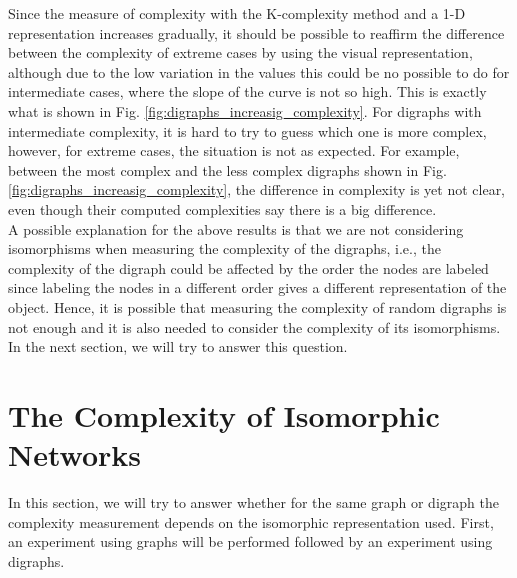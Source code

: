 Since the measure of complexity with the K-complexity method and a 1-D representation increases gradually, it should be possible to reaffirm the difference between the complexity of extreme cases by using the visual representation, although due to the low variation in the values this could be no possible to do for intermediate cases, where the slope of the curve is not so high.  This is exactly what is shown in Fig. \ref{fig:digraphs_increasig_complexity}. For digraphs with intermediate complexity, it is hard to try to guess which one is more complex, however, for extreme cases, the situation is not as expected. For example, between the most complex and the less complex digraphs shown in Fig. \ref{fig:digraphs_increasig_complexity}, the difference in complexity is yet not clear, even though their computed complexities say there is a big difference.\\

A possible explanation for the above results is that we are not considering isomorphisms when measuring the complexity of the digraphs, i.e., the complexity of the digraph could be affected by the order the nodes are labeled since labeling the nodes in a different order gives a different representation of the object. Hence, it is possible that measuring the complexity of random digraphs is not enough and it is also needed to consider the complexity of its isomorphisms. In the next section, we will try to answer this question.

\section{The Complexity of Isomorphic Networks}
\label{comp_iso_net_section}
In this section, we will try to answer whether for the same graph or digraph the complexity measurement depends on the isomorphic representation used. First, an experiment using graphs will be performed followed by an experiment using digraphs.


